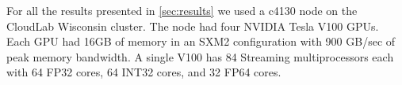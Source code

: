 For all the results presented in \ref{sec:results} we used a c4130 node on the CloudLab Wisconsin cluster. The node had four NVIDIA Tesla V100 GPUs. Each GPU had 16GB of memory in an SXM2 configuration with 900 GB/sec of peak memory bandwidth. A single V100 has 84 Streaming multiprocessors each with 64 FP32 cores, 64 INT32 cores, and 32 FP64 cores.


